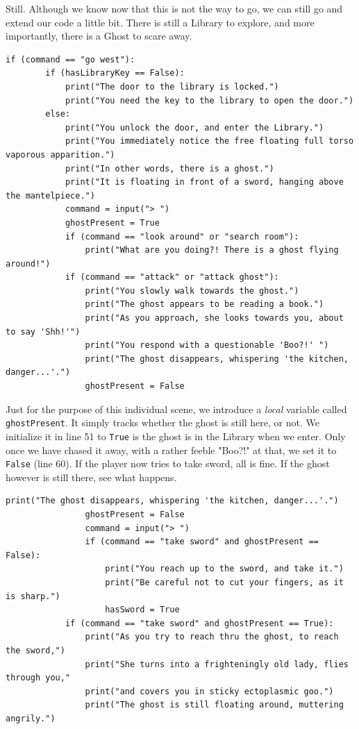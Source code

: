 Still. Although we know now that this is not the way to go, we can still go and extend our code a little bit. There is still a Library to explore, and more importantly, there is a Ghost to scare away. 

\begin{lstlisting}[firstnumber=41]
    if (command == "go west"):
        if (hasLibraryKey == False):
            print("The door to the library is locked.")
            print("You need the key to the library to open the door.")
        else:
            print("You unlock the door, and enter the Library.")
            print("You immediately notice the free floating full torso vaporous apparition.")
            print("In other words, there is a ghost.")
            print("It is floating in front of a sword, hanging above the mantelpiece.")
            command = input("> ")
            ghostPresent = True
            if (command == "look around" or "search room"):
                print("What are you doing?! There is a ghost flying around!")
            if (command == "attack" or "attack ghost"):
                print("You slowly walk towards the ghost.")
                print("The ghost appears to be reading a book.")
                print("As you approach, she looks towards you, about to say 'Shh!'")
                print("You respond with a questionable 'Boo?!' ")
                print("The ghost disappears, whispering 'the kitchen, danger...'.")
                ghostPresent = False
\end{lstlisting}

Just for the purpose of this individual scene, we introduce a \emph{local} variable called \texttt{ghostPresent}. It simply tracks whether the ghost is still here, or not. We initialize it in line 51 to \texttt{True} is the ghost is in the Library when we enter. Only once we have chased it away, with a rather feeble "Boo?!" at that, we set it to \texttt{False} (line 60). If the player now tries to take sword, all is fine. If the ghost however is still there, see what happens. 

\begin{lstlisting}[firstnumber=59]
                print("The ghost disappears, whispering 'the kitchen, danger...'.")
                ghostPresent = False
                command = input("> ")
                if (command == "take sword" and ghostPresent == False):
                    print("You reach up to the sword, and take it.")
                    print("Be careful not to cut your fingers, as it is sharp.")
                    hasSword = True
            if (command == "take sword" and ghostPresent == True):
                print("As you try to reach thru the ghost, to reach the sword,")
                print("She turns into a frighteningly old lady, flies through you,"
                print("and covers you in sticky ectoplasmic goo.")
                print("The ghost is still floating around, muttering angrily.")
\end{lstlisting} 


